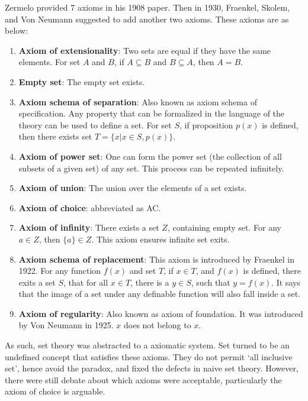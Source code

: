 \documentclass[b5paper]{article}
\begin{document}
Zermelo provided 7 axioms in his 1908 paper. Then in 1930, Fraenkel, Skolem, and Von Neumann suggested to add another two axioms. These axioms are as below:

\begin{enumerate}
\item \textbf{Axiom of extensionality}: Two sets are equal if they have the same elements. For set $A$ and $B$, if $A \subseteq B$ and $B \subseteq A$, then $A = B$.

\item \textbf{Empty set}: The empty set exists.

\item \textbf{Axiom schema of separation}: Also known as axiom schema of specification. Any property that can be formalized in the language of the theory can be used to define a set. For set $S$, if proposition $p(x)$ is defined, then there exists set $T = \{ x | x \in S, p(x)\}$.

\item \textbf{Axiom of power set}: One can form the power set (the collection of all subsets of a given set) of any set. This process can be repeated infinitely.

\item \textbf{Axiom of union}: The union over the elements of a set exists.

\item \textbf{Axiom of choice}: abbreviated as AC.

\item \textbf{Axiom of infinity}: There exists a set $Z$, containing empty set. For any $a \in Z$, then $\{a\} \in Z$. This axiom ensures infinite set exits.

\item \textbf{Axiom schema of replacement}: This axiom is introduced by Fraenkel in 1922. For any function $f(x)$ and set $T$, if $x \in T$, and $f(x)$ is defined, there exits a set $S$, that for all $x \in T$, there is a $y \in S$, such that $y = f(x)$. It says that the image of a set under any definable function will also fall inside a set.

\item \textbf{Axiom of regularity}: Also known as axiom of foundation. It was introduced by Von Neumann in 1925. $x$ does not belong to $x$.
\end{enumerate}

As such, set theory was abstracted to a axiomatic system. Set turned to be an undefined concept that satisfies these axioms. They do not permit `all inclusive set', hence avoid the paradox, and fixed the defects in naive set theory. However, there were still debate about which axioms were acceptable, particularly the axiom of choice is arguable.
\end{document}
